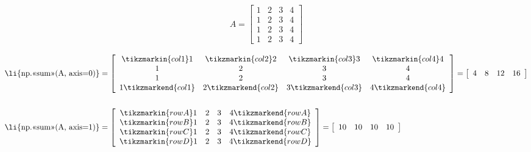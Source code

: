 \begin{align*}
A = \left[\begin{array}{cccc}
1 & 2 & 3 & 4\\
1 & 2 & 3 & 4\\
1 & 2 & 3 & 4\\
1 & 2 & 3 & 4
\end{array}\right]
\end{align*}

\begin{align*}
\text{\li{np.<<sum>>(A, axis=0)}} &= %
\left[\begin{array}{cccc}
\tikzmarkin{col1}1 & \tikzmarkin{col2}2 & \tikzmarkin{col3}3 & \tikzmarkin{col4}4\\
1 & 2 & 3 & 4\\
1 & 2 & 3 & 4\\
1\tikzmarkend{col1} & 2\tikzmarkend{col2} & 3\tikzmarkend{col3} & 4\tikzmarkend{col4}
\end{array}\right]
= \left[\begin{array}{cccc} 4 & 8 & 12 & 16 \end{array}\right]
\\ \\
\text{\li{np.<<sum>>(A, axis=1)}} &= %
\left[\begin{array}{cccc}
\tikzmarkin{rowA}1 & 2 & 3 & 4\tikzmarkend{rowA}\\
\tikzmarkin{rowB}1 & 2 & 3 & 4\tikzmarkend{rowB}\\
\tikzmarkin{rowC}1 & 2 & 3 & 4\tikzmarkend{rowC}\\
\tikzmarkin{rowD}1 & 2 & 3 & 4\tikzmarkend{rowD}\\
\end{array}\right]
= \left[\begin{array}{cccc} 10 & 10 & 10 & 10 \end{array}\right]
\end{align*}


